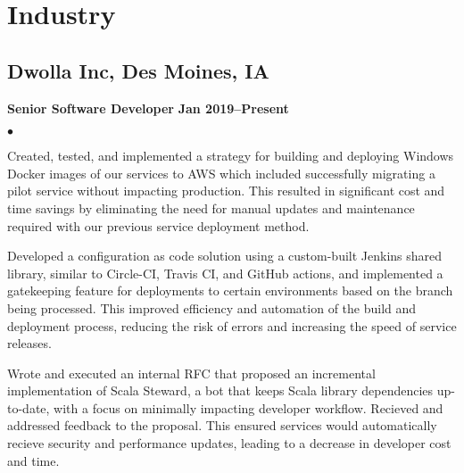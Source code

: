 \documentclass[10pt,letterpaper]{article}
\renewenvironment{itemize}{
  \begin{list}{}{
      \setlength{\leftmargin}{1.5em}
      \setlength{\itemsep}{0.25em}
      \setlength{\parskip}{0pt}
      \setlength{\parsep}{0.25em}
    }
  }{
  \end{list}
}
\newenvironment{bitemize}{
  \begin{list}{\(\bullet \)}{
      \setlength{\leftmargin}{1.5em}
      \setlength{\itemsep}{0.25em}
      \setlength{\parskip}{0pt}
      \setlength{\parsep}{0.25em}
    }
  }{
  \end{list}
}
\newcommand{\yearrange}[1]{\hfill \textbf{#1} \par}
\begin{document}
\section*{Industry}

\subsection*{Dwolla Inc, Des Moines, IA}

\begin{itemize}
  \item \textbf{Senior Software Developer} \yearrange{Jan 2019--Present}
  \begin{bitemize}
    \item Created, tested, and implemented a strategy for building and deploying
      Windows Docker images of our services to AWS which included successfully
      migrating a pilot service without impacting production. This resulted in
      significant cost and time savings by eliminating the need for manual
      updates and maintenance required with our previous service deployment
      method.
    \item Developed a configuration as code solution using a custom-built
      Jenkins shared library, similar to Circle-CI, Travis CI, and GitHub
      actions, and implemented a gatekeeping feature for deployments to certain
      environments based on the branch being processed. This improved efficiency
      and automation of the build and deployment process, reducing the risk of
      errors and increasing the speed of service releases.
    \item Wrote and executed an internal RFC that proposed an incremental
      implementation of Scala Steward, a bot that keeps Scala library
      dependencies up-to-date, with a focus on minimally impacting developer
      workflow. Recieved and addressed feedback to the proposal. This ensured
      services would automatically recieve security and performance updates,
      leading to a decrease in developer cost and time.
  \end{bitemize}
\end{itemize}
\end{document}
